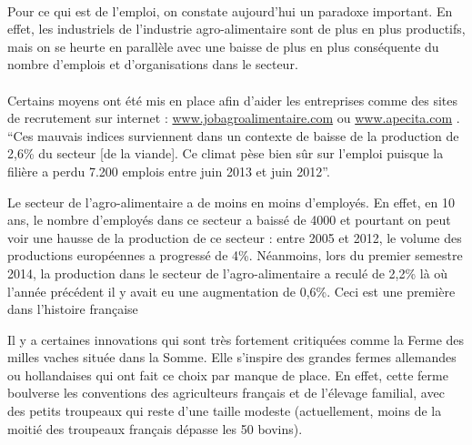 \documentclass[a4paper,12pt]{report}
\begin{document}
			\paragraph{}Pour ce qui est de l’emploi, on constate aujourd'hui un paradoxe important. En effet, les industriels de l’industrie agro-alimentaire sont de plus en plus productifs, mais on se heurte en parallèle avec une baisse de plus en plus conséquente du nombre d’emplois et d’organisations dans le secteur.
			
			\paragraph{}Certains moyens ont été mis en place afin d’aider les entreprises comme des sites de recrutement sur internet : \url{www.jobagroalimentaire.com} ou \url{www.apecita.com} .  “Ces mauvais indices surviennent dans un contexte de baisse de la production de 2,6\% du secteur [de la viande]. Ce climat pèse bien sûr sur l'emploi puisque la filière a perdu 7.200 emplois entre juin 2013 et juin 2012”\cite{DeficitCommercialViandeAggrave}.
			
			Le secteur de l’agro-alimentaire a de moins en moins d’employés. En effet, en 10 ans, le nombre d’employés dans ce secteur a baissé de 4000\cite{IAAHeritageAgricoleBretagne} et pourtant on peut voir une hausse de la production de ce secteur : entre 2005 et 2012, le volume des productions européennes a progressé de 4\%\cite{HausseModereeVenteProduitsAA2012}. Néanmoins, lors du premier semestre 2014, la production dans le secteur de l’agro-alimentaire a reculé de 2,2\% là où l’année précédent il y avait eu une augmentation de 0,6\%\cite{ReculHistoriqueProductionAAFrance}. Ceci est une première dans l’histoire française
			
			Il y a certaines innovations qui sont très fortement critiquées comme la Ferme des milles vaches située dans la Somme\cite{Ferme1000Vaches}. Elle s'inspire des grandes fermes allemandes ou hollandaises qui ont fait ce choix par manque de place. En effet, cette ferme boulverse les conventions des agriculteurs français et de l'élevage familial, avec des petits troupeaux qui reste d’une taille modeste (actuellement, moins de la moitié des troupeaux français dépasse les 50 bovins).
			
\end{document}
